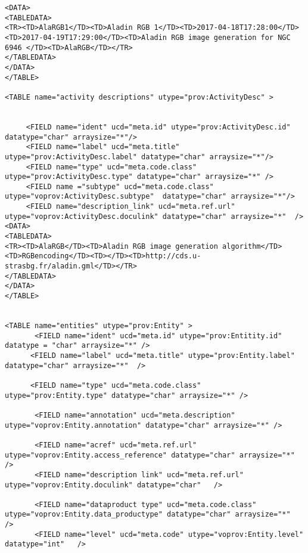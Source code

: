 \begin{itemize}
\begin{verbatim}
<DATA>
<TABLEDATA>
<TR><TD>AlaRGB1</TD><TD>Aladin RGB 1</TD><TD>2017-04-18T17:28:00</TD><TD>2017-04-19T17:29:00</TD><TD>Aladin RGB image generation for NGC 6946 </TD><TD>AlaRGB</TD></TR>
</TABLEDATA>
</DATA>      
</TABLE>

<TABLE name="activity descriptions" utype="prov:ActivityDesc" >

     
     <FIELD name="ident" ucd="meta.id" utype="prov:ActivityDesc.id" datatype="char" arraysize="*"/>
     <FIELD name="label" ucd="meta.title" utype="prov:ActivityDesc.label" datatype="char" arraysize="*"/>
     <FIELD name="type" ucd="meta.code.class" utype="prov:ActivityDesc.type" datatype="char" arraysize="*" />
     <FIELD name ="subtype" ucd="meta.code.class" utype="voprov:ActivityDesc.subtype"  datatype="char" arraysize="*"/>
     <FIELD name="description_link" ucd="meta.ref.url" utype="voprov:ActivityDesc.doculink" datatype="char" arraysize="*"  />  
<DATA>
<TABLEDATA>
<TR><TD>AlaRGB</TD><TD>Aladin RGB image generation algorithm</TD><TD>RGBencoding</TD><TD></TD><TD>http://cds.u-strasbg.fr/aladin.gml</TD></TR>
</TABLEDATA>
</DATA>      
</TABLE>


<TABLE name="entities" utype="prov:Entity" >
       <FIELD name="ident" ucd="meta.id" utype="prov:Entitity.id" datatype = "char" arraysize="*" />
      <FIELD name="label" ucd="meta.title" utype="prov:Entity.label" datatype="char" arraysize="*"  />

      <FIELD name="type" ucd="meta.code.class" utype="prov:Entity.type" datatype="char" arraysize="*" />

       <FIELD name="annotation" ucd="meta.description" utype="voprov:Entity.annotation" datatype="char" arraysize="*" />

       <FIELD name="acref" ucd="meta.ref.url" utype="voprov:Entity.access_reference" datatype="char" arraysize="*" />
       <FIELD name="description link" ucd="meta.ref.url"  utype="voprov:Entity.doculink" datatype="char"   />

       <FIELD name="dataproduct type" ucd="meta.code.class"  utype="voprov:Entity.data_productype" datatype="char" arraysize="*"  />
       <FIELD name="level" ucd="meta.code" utype="voprov:Entity.level" datatype="int"   />  
 

\end{verbatim}
\end{itemize}
